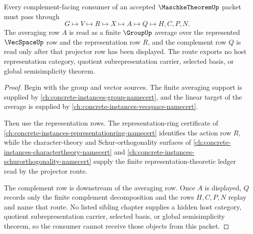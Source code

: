 \begin{theorem}
\label{thm:maschke-theorem-averaging-projector-route}
Every complement-facing consumer of an accepted $\MaschkeTheoremUp$ packet must pass through
$$
G \longmapsto V \longmapsto R \longmapsto X \longmapsto A \longmapsto Q \longmapsto H,C,P,N .
$$
The averaging row $A$ is read as a finite $\GroupUp$ average over the represented $\VecSpaceUp$ row and the representation row $R$, and the complement row $Q$ is read only after that projector row has been displayed. The route exports no host representation category, quotient subrepresentation carrier, selected basis, or global semisimplicity theorem.
\end{theorem}
\begin{proof}
Begin with the group and vector sources. The finite averaging support is supplied by \autoref{ch:concrete-instances-group-namecert}, and the linear target of the average is supplied by \autoref{ch:concrete-instances-vecspace-namecert}.

Then use the representation rows. The representation-ring certificate of \autoref{ch:concrete-instances-representationring-namecert} identifies the action row $R$, while the character-theory and Schur-orthogonality surfaces of \autoref{ch:concrete-instances-charactertheory-namecert} and \autoref{ch:concrete-instances-schurorthogonality-namecert} supply the finite representation-theoretic ledger read by the projector route.

The complement row is downstream of the averaging row. Once $A$ is displayed, $Q$ records only the finite complement decomposition and the rows $H,C,P,N$ replay and name that route. No listed sibling chapter supplies a hidden host category, quotient subrepresentation carrier, selected basis, or global semisimplicity theorem, so the consumer cannot receive those objects from this packet.
\end{proof}

